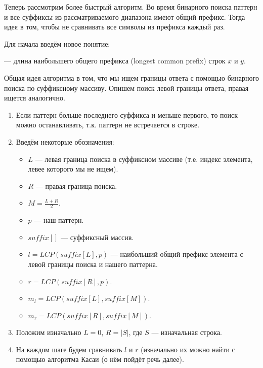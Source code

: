 Теперь рассмотрим более быстрый алгоритм. Во время бинарного поиска паттерн и все суффиксы из
рассматриваемого диапазона имеют общий префикс. Тогда идея в том, чтобы не сравнивать все символы из
префикса каждый раз. 

Для начала введём новое понятие:
\begin{definition}
   --- длина наибольшего общего префикса (longest common prefix) строк $x$ и $y$. 
\end{definition}

Общая идея алгоритма в том, что мы ищем границы ответа с помощью бинарного поиска по суффиксному
массиву. Опишем поиск левой границы ответа, правая ищется аналогично.

\begin{enumerate}
        \item Если паттерн больше последнего суффикса и меньше первого, то поиск можно останавливать, т.к.
        паттерн не встречается в строке.
        \item Введём некоторые обозначения: 
                \begin{itemize}
                        \item $L$ --- левая граница поиска в суффиксном массиве (т.е. индекс элемента,
                                левее которого мы не ищем).
                        \item $R$ --- правая граница поиска.
                        \item $M = \frac{L+R}{2}$. 
                        \item $p$ --- наш паттерн.
                        \item $suffix[]$ --- суффиксный массив.
                        \item $l = LCP(suffix[L], p)$ --- наибольший общий префикс элемента с левой границы
                        поиска и нашего паттерна.
                        \item $r = LCP(suffix[R], p)$.
                        \item $m_{l} = LCP(suffix[L], suffix[M])$.
                        \item  $m_{r} = LCP(suffix[R], suffix[M])$.
                \end{itemize}
        \item Положим изначально $L = 0$, $R = \left| S \right| $, где $S$ --- изначальная строка.
        \item На каждом шаге будем сравнивать $l$ и $r$ (изначально их можно найти с помощью алгоритма Касаи
        (о нём пойдёт речь далее).


\end{enumerate}
